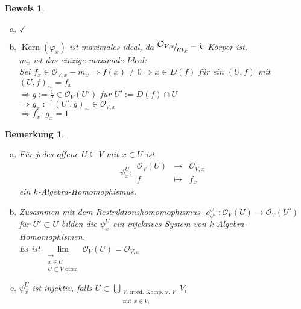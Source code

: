 \documentclass[a4paper,12pt]{report}
\theoremstyle{break}
\newtheorem{Bem}[Def]{Bemerkung}
\theoremstyle{nonumberbreak}
\newtheorem{Bew}{Beweis}
\theoremstyle{nonumberplain}
\DeclareMathOperator{\Kern}{Kern}
\newcommand{\calO}{\mathcal{O}}
\newcommand{\FakRaum}[2]{
  \raisebox{0.7ex}{\ensuremath{#1}}
  \ensuremath{\mkern-3mu}\big/\ensuremath{\mkern-3mu}
  \raisebox{-0.6ex}{\ensuremath{#2}}}
\begin{document}
\begin{Bew}\begin{enumerate}[a)]
\item
	$\checkmark$
\item
	$\Kern(\varphi_x)$ ist maximales ideal, da $\FakRaum{\calO_{V,x}}{m_x}=k$ K\"orper ist.\\
	\emph{$m_x$ ist das einzige maximale Ideal:}\\
	Sei $f_x\in \calO_{V,x}-m_x\Rightarrow f(x)\ne0\Rightarrow x\in D(f)$ f\"ur ein $(U,f)$ mit $(U,f)_\sim=f_x$\\
	$\Rightarrow g:=\frac{1}{f}\in\calO_V(U')$ f\"ur $U':=D(f)\cap U$\\
	$\Rightarrow g_x:=(U',g)_\sim \in \calO_{V,x}$\\
	$\Rightarrow f_x\cdot g_x=1$
\end{enumerate}\end{Bew}

\begin{Bem}\label{bem15.3}\begin{enumerate}[a)]
\item\label{bem15.3a}
	F\"ur jedes offene $U\subseteq V$ mit $x\in U$ ist
		\[\psi_x^U:\begin{array}{rcl}\calO_V(U) &\to& \calO_{V,x}\\f &\mapsto& f_x\end{array}\]
	ein $k$-Algebra-Homomophismus.
\item\label{bem15.3b}
	Zusammen mit dem Restriktionshomomophismus $\varrho_{U'}^U:\calO_V(U)\to\calO_V(U')$ f\"ur $U'\subset U$ bilden die $\psi_x^U$ ein injektives System von $k$-Algebra-Homomophismen.\\
	Es ist $\lim\limits_{\substack{\longrightarrow\\x\in U\\ U\subset V \text{ offen}}} \calO_V(U)=\calO_{V,x}$
	\begin{center}\end{center}
\item\label{bem15.3c}
	$\psi_x^U$ ist injektiv, falls $U\subset \bigcup\limits_{\substack{V_i\text{ irred. Komp. v. }V\\ \text{mit }x\in V_i}} V_i$
\end{enumerate}\end{Bem}
\end{document}
